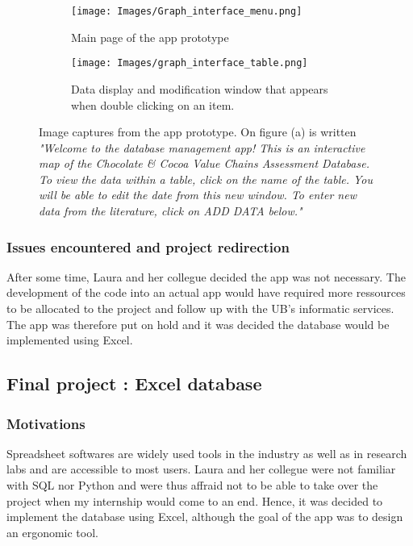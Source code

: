 \documentclass{article}
\begin{document}
\begin{figure}[htbp]
  \centering
  \begin{subfigure}[b]{0.4\textwidth}
    \texttt{[image: Images/Graph\_interface\_menu.png]}
    \caption{Main page of the app prototype}
    \label{fig:my_image1}
  \end{subfigure}
  \hfill
  \begin{subfigure}[b]{0.58\textwidth}
    \texttt{[image: Images/graph\_interface\_table.png]}
    \caption{Data display and modification window that appears when double
      clicking on an item.}
    \label{fig:my_image2}
  \end{subfigure}
  \caption{Image captures from the app prototype. On figure (a) is written
    \textit{ "Welcome to the database management app! This is an interactive
      map of
      the Chocolate \& Cocoa Value Chains Assessment Database. To view the data
      within
      a table, click on the name of the table. You will be able to edit the
      date from
      this new window. To enter new data from the literature, click on ADD DATA
      below."}}\label{fig:my_images}
\end{figure}

\subsubsection{Issues encountered and project redirection}
After some time, Laura and her collegue decided the app was not necessary. The
development of the code into an actual app would have required more
ressources to be allocated to the project and follow up with the UB's informatic
services. The app was therefore put on hold and it was decided the database
would be implemented using Excel.

\hspace{2cm}

\subsection{Final project : Excel database}
\subsubsection{Motivations}
Spreadsheet softwares are widely used tools in the industry as well as in
research labs and are accessible to most users. Laura and her collegue were not
familiar with SQL nor Python and were thus affraid not to be able to take over
the project when my internship would come to an end. Hence, it was decided to 
implement the database using Excel, although the goal of the app was to design
an ergonomic tool.
\end{document}
